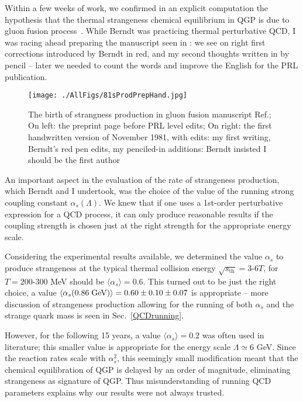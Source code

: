 Within a few weeks of work, we confirmed in an explicit computation the hypothesis that the thermal strangeness chemical equilibrium in QGP is due to gluon fusion process~\cite{Rafelski:1982pu}. While Berndt was practicing thermal perturbative QCD, I was racing ahead preparing the manuscript seen in : we see on right first corrections introduced by Berndt in red, and my second thoughts written in by pencil -- later we needed to count the words and improve the English for the PRL publication.


\begin{figure}[tb]\sidecaption
\texttt{[image: ./AllFigs/81sProdPrepHand.jpg]}
\caption{The birth of strangness production in gluon fusion manuscript Ref.\cite{Rafelski:1982pu}; On left: the preprint page before PRL level edits; On right: the first handwritten version of November 1981, with edits: my first writing, Berndt\rq s red pen edits, my penciled-in additions: Berndt insisted I should be the first author}\label{sProdPrep}
\end{figure}

An important aspect in the evaluation of the rate of strangeness production, which Berndt and I undertook, was the choice of the value of the running strong coupling constant $\alpha_s(\Lambda)$. We knew that if one uses a 1st-order perturbative expression for a QCD process, it can only produce reasonable results if the coupling strength is chosen just at the right strength for the appropriate energy scale. 

Considering the experimental results available, we determined the value $\alpha_s$ to produce strangeness at the typical thermal collision energy $\sqrt{s_\mathrm{th}}=3$-$6T$, for $T=200$-$300$ MeV should be $\langle\alpha_s\rangle=0.6$. This turned out to be just the right choice, a value $\langle\alpha_s(0.86\;\rm{GeV})\rangle=0.60\pm0.10\pm0.07$ is appropriate -- more discussion of strangeness production allowing for the running of both $\alpha_s$ and the strange quark mass is seen in Sec.~\ref{QCDrunning}. 

However, for the following 15 years, a value $\langle\alpha_s\rangle=0.2$ was often used in literature; this smaller value is appropriate for the energy scale $\Lambda\simeq 6$ GeV. Since the reaction rates scale with $\alpha_s^2$, this seemingly small modification meant that the chemical equilibration of QGP is delayed by an order of magnitude, eliminating strangeness as signature of QGP. Thus misunderstanding of running QCD parameters explains why our results were not always trusted.

